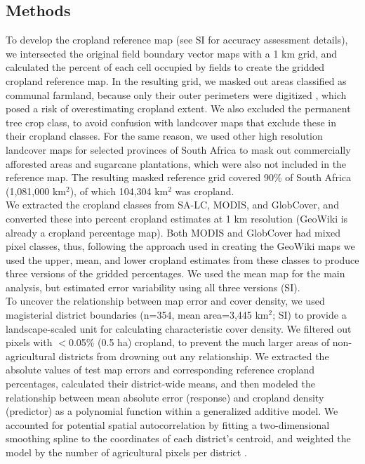 \documentclass{pnastwo2}
\begin{document}
\begin{article}



\begin{materials}
\section{Methods} 
To develop the cropland reference map (see SI for accuracy assessment details), we intersected the original field boundary vector maps with a 1 km grid, and calculated the percent of each cell occupied by fields to create the gridded cropland reference map. In the resulting grid, we masked out areas classified as communal farmland, because only their outer perimeters were digitized \cite{fourie_better_2009}, which posed a risk of overestimating cropland extent. We also excluded the permanent tree crop class, to avoid confusion with landcover maps that exclude these in their cropland classes. For the same reason, we used other high resolution landcover maps for selected provinces of South Africa to mask out commercially afforested areas and sugarcane plantations, which were also not included in the reference map. The resulting masked reference grid covered 90\% of South Africa (1,081,000 km$^2$), of which 104,304 km$^2$ was cropland.\\
\indent We extracted the cropland classes from SA-LC, MODIS, and GlobCover, and converted these into percent cropland estimates at 1 km resolution (GeoWiki is already a cropland percentage map). Both MODIS and GlobCover had mixed pixel classes, thus, following the approach used in creating the GeoWiki maps \cite{fritz_mapping_2015} we used the upper, mean, and lower cropland estimates from these classes to produce three versions of the gridded percentages. We used the mean map for the main analysis, but estimated error variability using all three versions (SI).\\  
\indent To uncover the relationship between map error and cover density, we used magisterial district boundaries (n=354, mean area=3,445 km$^2$; SI) to provide a landscape-scaled unit for calculating characteristic cover density. We filtered out pixels with $<$0.05\% (0.5 ha) cropland, to prevent the much larger areas of non-agricultural districts from drowning out any relationship. We extracted the absolute values of test map errors and corresponding reference cropland percentages, calculated their district-wide means, and then modeled the relationship between mean absolute error (response) and cropland density (predictor) as a polynomial function within a generalized additive model. We accounted for potential spatial autocorrelation by fitting a two-dimensional smoothing spline to the coordinates of each district's centroid, and weighted the model by the number of agricultural pixels per district \cite{wood_mgcv:_2001}.\\   

\end{materials}
\end{article}
\end{document}
